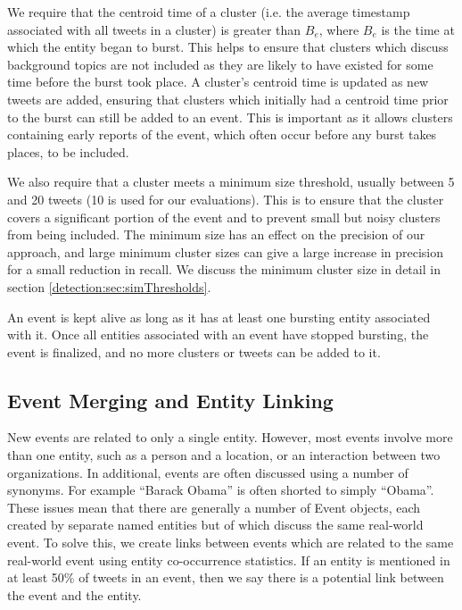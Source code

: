 We require that the centroid time of a cluster (i.e. the average timestamp associated with all tweets in a cluster) is greater than \(B_e\), where \(B_e\) is the time at which the entity began to burst. This helps to ensure that clusters which discuss background topics are not included as they are likely to have existed for some time before the burst took place. A cluster's centroid time is updated as new tweets are added, ensuring that clusters which initially had a centroid time prior to the burst can still be added to an event. This is important as it allows clusters containing early reports of the event, which often occur before any burst takes places, to be included.

We also require that a cluster meets a minimum size threshold, usually between 5 and 20 tweets (10 is used for our evaluations).
This is to ensure that the cluster covers a significant portion of the event and to prevent small but noisy clusters from being included. The minimum size has an effect on the precision of our approach, and large minimum cluster sizes can give a large increase in precision for a small reduction in recall. We discuss the minimum cluster size in detail in section \ref{detection:sec:simThresholds}.

An event is kept alive as long as it has at least one bursting entity associated with it. Once all entities associated with an event have stopped bursting, the event is finalized, and no more clusters or tweets can be added to it.

\subsection{Event Merging and Entity Linking}
\label{detection:sec:entityLinking}
New events are related to only a single entity.
However, most events involve more than one entity, such as a person and a location, or an interaction between two organizations.
In additional, events are often discussed using a number of synonyms.
For example ``Barack Obama'' is often shorted to simply ``Obama''.
These issues mean that there are generally a number of Event objects, each created by separate named entities but of which discuss the same real-world event.
To solve this, we create links between events which are related to the same real-world event using entity co-occurrence statistics.
If an entity is mentioned in at least 50\% of tweets in an event, then we say there is a potential link between the event and the entity.

